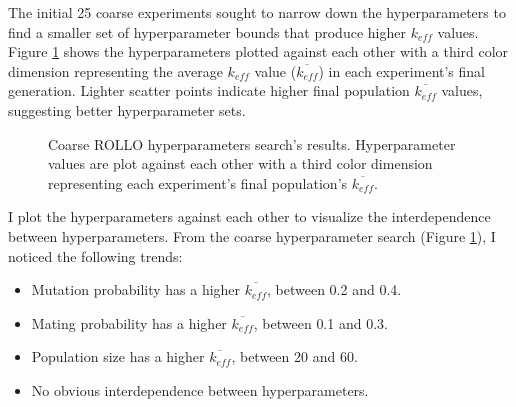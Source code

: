 The initial 25 coarse experiments sought to narrow down the hyperparameters 
to find a smaller set of hyperparameter bounds that produce higher $k_{eff}$ values.
Figure \ref{fig:hyperparameter_sens} shows the hyperparameters plotted against 
each other with a third color dimension representing the average $k_{eff}$ value
($\overline{k_{eff}}$) in each experiment's final generation. 
Lighter scatter points indicate higher final population $\overline{k_{eff}}$ values, 
suggesting better hyperparameter sets. 
\begin{figure}[htbp]
    \centering
    \caption{Coarse \acrfull{ROLLO} hyperparameters search's results. 
    Hyperparameter values are plot against each other with a third color dimension 
    representing each experiment's final population's $\overline{k_{eff}}$.}
    \label{fig:hyperparameter_sens}
\end{figure}
I plot the hyperparameters against each other to visualize the interdependence 
between hyperparameters. 
From the coarse hyperparameter search (Figure \ref{fig:hyperparameter_sens}), 
I noticed the following trends: 
\begin{itemize}
    \item Mutation probability has a higher $\overline{k_{eff}}$, between 0.2 and 0.4. 
    \item Mating probability has a higher $\overline{k_{eff}}$, between 0.1 and 0.3. 
    \item Population size has a higher $\overline{k_{eff}}$, between 20 and 60. 
    \item No obvious interdependence between hyperparameters. 
\end{itemize} 

